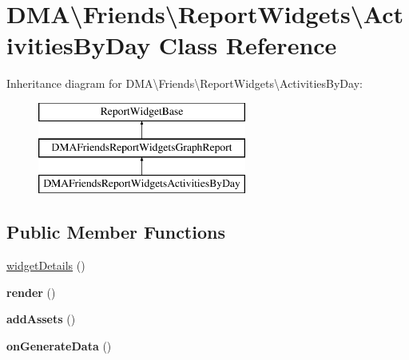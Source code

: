\hypertarget{classDMA_1_1Friends_1_1ReportWidgets_1_1ActivitiesByDay}{}\section{D\+M\+A\textbackslash{}Friends\textbackslash{}Report\+Widgets\textbackslash{}Activities\+By\+Day Class Reference}
\label{classDMA_1_1Friends_1_1ReportWidgets_1_1ActivitiesByDay}
Inheritance diagram for D\+M\+A\textbackslash{}Friends\textbackslash{}Report\+Widgets\textbackslash{}Activities\+By\+Day\+:\begin{figure}[H]
\begin{center}
\leavevmode
\includegraphics[height=3.000000cm]{d4/d1a/classDMA_1_1Friends_1_1ReportWidgets_1_1ActivitiesByDay}
\end{center}
\end{figure}
\subsection*{Public Member Functions}
\begin{DoxyCompactItemize}
\item 
\hyperlink{classDMA_1_1Friends_1_1ReportWidgets_1_1ActivitiesByDay_a4ebe03184ffd39cdc0873ae789c16d0b}{widget\+Details} ()
\item 
\hypertarget{classDMA_1_1Friends_1_1ReportWidgets_1_1ActivitiesByDay_a9f7c3031dcc7bf83f1b601cc1294d96a}{}{\bfseries render} ()\label{classDMA_1_1Friends_1_1ReportWidgets_1_1ActivitiesByDay_a9f7c3031dcc7bf83f1b601cc1294d96a}

\item 
\hypertarget{classDMA_1_1Friends_1_1ReportWidgets_1_1ActivitiesByDay_a119ed5cd27d51563cbf8410ed871c271}{}{\bfseries add\+Assets} ()\label{classDMA_1_1Friends_1_1ReportWidgets_1_1ActivitiesByDay_a119ed5cd27d51563cbf8410ed871c271}

\item 
\hypertarget{classDMA_1_1Friends_1_1ReportWidgets_1_1ActivitiesByDay_ab6e9c6ac1a9a3a83b1e55d396b19798c}{}{\bfseries on\+Generate\+Data} ()\label{classDMA_1_1Friends_1_1ReportWidgets_1_1ActivitiesByDay_ab6e9c6ac1a9a3a83b1e55d396b19798c}

\end{DoxyCompactItemize}
